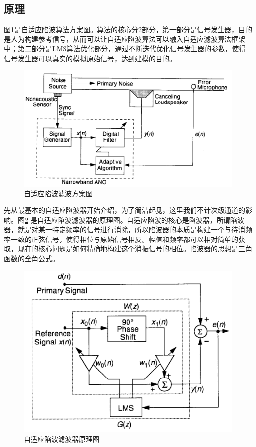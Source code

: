 \documentclass[12pt]{article}
\begin{document}
\subsection{原理}
图\ref{fig:fig1}是自适应陷波算法方案图。算法的核心分2部分，第一部分是信号发生器，目的是人为构建参考信号，从而可以让自适应陷波算法可以融入自适应滤波算法框架中；第二部分是LMS算法优化部分，通过不断迭代优化信号发生器的参数，使得信号发生器可以真实的模拟原始信号，达到建模的目的。
\begin{figure}[H]
\begin{center}
\includegraphics[width=0.9\linewidth]{./images/自适应陷波滤波原理草图.png}
\caption{自适应陷波滤波方案图}
\label{fig:fig1}
\end{center}
\end{figure}

先从最基本的自适应陷波器开始介绍，为了简洁起见，这里我们不计次级通道的影响。图\ref{fig:fig2} 是自适应陷波滤波器的原理图。自适应陷波的核心是陷波器，所谓陷波器，就是对某一特定频率的信号进行消除，所以陷波器的本质是构建一个与待消频率一致的正弦信号，使得相位与原始信号相反。幅值和频率都可以相对简单的获取，现在的核心问题是如何精确地构建这个消振信号的相位。陷波器的思想是三角函数的全角公式。

\begin{figure}[H]
\begin{center}
\includegraphics[width=0.9\linewidth]{./images/自适应陷波滤波器原理.png}
\caption{自适应陷波滤波器原理图}
\label{fig:fig2}
\end{center}
\end{figure}
\end{document}
